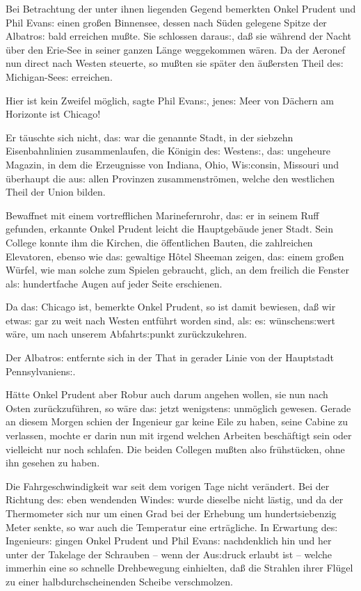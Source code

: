\documentclass[oneside,12pt]{book}
\newcommand{\s}{s:}
\begin{document}
Bei Betrachtung der unter ihnen liegenden Gegend bemerkten Onkel
Prudent und Phil Evan{\s} einen gro{\ss}en Binnensee, dessen nach
S\"uden gelegene Spitze der {\glqq}Albatro{\s}{\grqq} bald erreichen
mu{\ss}te. Sie schlossen darau{\s}, da{\ss} sie w\"ahrend der Nacht
\"uber den Erie-See in seiner ganzen L\"ange weggekommen w\"aren. Da
der Aeronef nun direct nach Westen steuerte, so mu{\ss}ten sie
sp\"ater den \"au{\ss}ersten Theil de{\s} Michigan-See{\s} erreichen.

{\glqq}Hier ist kein Zweifel m\"oglich, sagte Phil Evan{\s}, jene{\s}
Meer von D\"achern am Horizonte ist Chicago!{\grqq}

Er t\"auschte sich nicht, da{\s} war die genannte Stadt, in der
siebzehn Eisenbahnlinien zusammenlaufen, die K\"onigin de{\s}
Westen{\s}, da{\s} ungeheure Magazin, in dem die Erzeugnisse von
Indiana, Ohio, Wi{\s}consin, Missouri und \"uberhaupt die au{\s}
allen Provinzen zusammenstr\"omen, welche den westlichen Theil der
Union bilden.

Bewaffnet mit einem vortrefflichen Marinefernrohr, da{\s} er in
seinem Ruff gefunden, erkannte Onkel Prudent leicht die
Hauptgeb\"aude jener Stadt. Sein College konnte ihm die Kirchen, die
\"offentlichen Bauten, die zahlreichen Elevatoren, ebenso wie da{\s}
gewaltige H\^otel Sheeman zeigen, da{\s} einem gro{\ss}en W\"urfel,
wie man solche zum Spielen gebraucht, glich, an dem freilich die
Fenster al{\s} hundertfache Augen auf jeder Seite erschienen.

{\glqq}Da da{\s} Chicago ist, bemerkte Onkel Prudent, so ist damit
bewiesen, da{\ss} wir etwa{\s} gar zu weit nach Westen entf\"uhrt
worden sind, al{\s} e{\s} w\"unschen{\s}wert w\"are, um nach unserem
Abfahrt{\s}punkt zur\"uckzukehren.{\grqq}

Der {\glqq}Albatro{\s}{\grqq} entfernte sich in der That in gerader
Linie von der Hauptstadt Pennsylvanien{\s}.

H\"atte Onkel Prudent aber Robur auch darum angehen wollen, sie nun
nach Osten zur\"uckzuf\"uhren, so w\"are da{\s} jetzt wenigsten{\s}
unm\"oglich gewesen. Gerade an diesem Morgen schien der Ingenieur gar
keine Eile zu haben, seine Cabine zu verlassen, mochte er darin nun
mit irgend welchen Arbeiten besch\"aftigt sein oder vielleicht nur
noch schlafen. Die beiden Collegen mu{\ss}ten also fr\"uhst\"ucken,
ohne ihn gesehen zu haben.

Die Fahrgeschwindigkeit war seit dem vorigen Tage nicht ver\"andert.
Bei der Richtung de{\s} eben wendenden Winde{\s} wurde dieselbe nicht
l\"astig, und da der Thermometer sich nur um einen Grad bei der
Erhebung um hundertsiebenzig Meter senkte, so war auch die Temperatur
eine ertr\"agliche. In Erwartung de{\s} Ingenieur{\s} gingen Onkel
Prudent und Phil Evan{\s} nachdenklich hin und her unter der Takelage
der Schrauben -- wenn der Au{\s}druck erlaubt ist -- welche immerhin
eine so schnelle Drehbewegung einhielten, da{\ss} die Strahlen ihrer
Fl\"ugel zu einer halbdurchscheinenden Scheibe verschmolzen.
\end{document}
